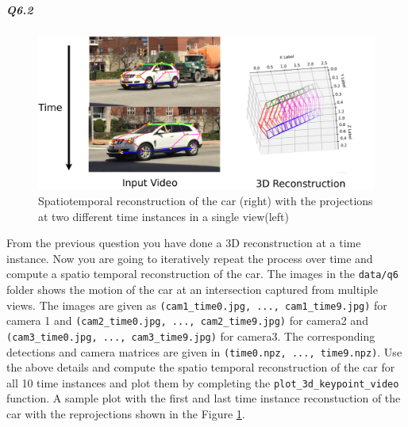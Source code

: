 
\begin{your_solution}[title=Q6.1,height=5.5cm,width=\linewidth]
\end{your_solution}

\subparagraph*{Q6.2}
\begin{figure}[t]
    \centering
    \includegraphics[width=\textwidth]{images/q6/temporal_new.png}
    \caption{Spatiotemporal reconstruction of the car (right) with the projections at two different time instances in a single view(left)}
    \label{fig:q6.2}
\end{figure}
From the previous question you have done a 3D reconstruction at a time instance. Now you are going to iteratively repeat the process over time and compute a spatio temporal reconstruction of the car. The images in the \texttt{data/q6} folder shows the motion of the car at an intersection captured from multiple views. The images are given as \texttt{(cam1\_time0.jpg, ..., cam1\_time9.jpg)} for camera 1 and \texttt{(cam2\_time0.jpg, ..., cam2\_time9.jpg)} for camera2 and \texttt{(cam3\_time0.jpg, ..., cam3\_time9.jpg)} for camera3.  The corresponding detections and camera matrices are given in \texttt{(time0.npz, ..., time9.npz)}. Use the above details and compute the spatio temporal reconstruction of the car for all 10 time instances and plot them by completing the \texttt{plot\_3d\_keypoint\_video} function. A sample plot with the first and last time instance reconstuction of the car with the reprojections shown in the Figure \ref{fig:q6.2}.  

